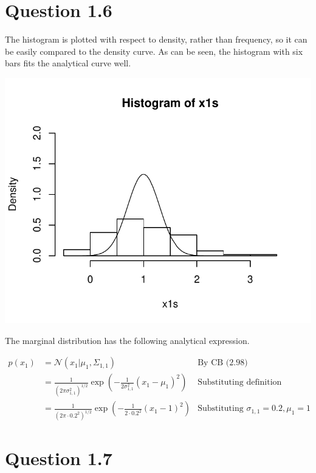 \documentclass[a4paper, oneside, final]{memoir}
\begin{document}
\section*{Question 1.6}

The histogram is plotted with respect to density, rather than
frequency, so it can be easily compared to the density curve.  As can
be seen, the histogram with six bars fits the analytical curve well.

\includegraphics{img/question16-plot-analytical.pdf}

The marginal distribution has the following analytical expression.

\begin{align*}
  p(x_1) &= \mathcal{N}(x_1|\mu_1,\Sigma_{1,1}) & \text{By CB (2.98)}\\
  &=
  \frac{1}{(2\pi\sigma_{1,1}^2)^{1/2}}\exp\left({-\frac{1}{2\sigma_{1,1}^2}(x_1-\mu_1)^2}\right)
  & \text{Substituting definition} \\
  &=
  \frac{1}{(2\pi\cdot 0.2^2)^{1/2}}\exp\left({-\frac{1}{2\cdot0.2^2}(x_1-1)^2}\right)
  & \text{Substituting $\sigma_{1,1}=0.2,\mu_1=1$}
\end{align*}

\section*{Question 1.7}
\end{document}
